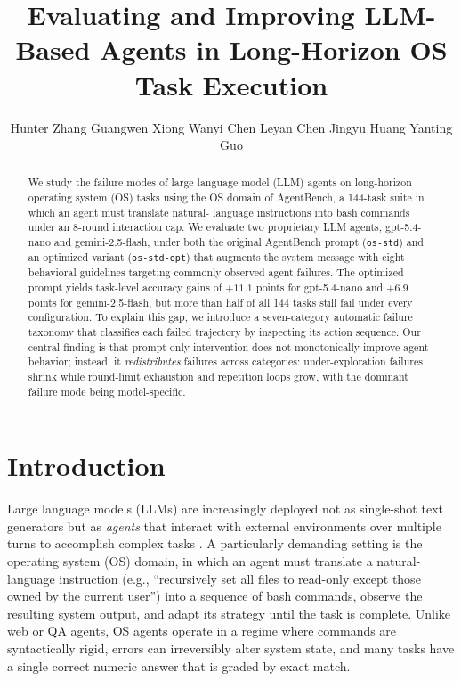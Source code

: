 \documentclass[11pt]{article}
\title{Evaluating and Improving LLM-Based Agents in Long-Horizon OS Task Execution}
\author{ Hunter Zhang \And Guangwen Xiong \And Wanyi Chen \And Leyan Chen \And Jingyu Huang \And Yanting Guo}
\begin{document}
\maketitle
\begin{abstract}
We study the failure modes of large language model (LLM) agents on
long-horizon operating system (OS) tasks using the OS domain of
AgentBench, a 144-task suite in which an agent must translate natural-
language instructions into bash commands under an 8-round interaction
cap. We evaluate two proprietary LLM agents, gpt-5.4-nano and
gemini-2.5-flash, under both the original AgentBench prompt
(\texttt{os-std}) and an optimized variant (\texttt{os-std-opt}) that
augments the system message with eight behavioral guidelines targeting
commonly observed agent failures. The optimized prompt yields task-level
accuracy gains of $+11.1$ points for gpt-5.4-nano and $+6.9$ points for
gemini-2.5-flash, but more than half of all 144 tasks still fail under
every configuration. To explain this gap, we introduce a seven-category
automatic failure taxonomy that classifies each failed trajectory by
inspecting its action sequence. Our central finding is that prompt-only
intervention does not monotonically improve agent behavior; instead, it
\emph{redistributes} failures across categories: under-exploration
failures shrink while round-limit exhaustion and repetition loops grow,
with the dominant failure mode being model-specific.
\end{abstract}

\section{Introduction}

Large language models (LLMs) are increasingly deployed not as single-shot
text generators but as \emph{agents} that interact with external
environments over multiple turns to accomplish complex tasks
\citep{yao2022react, liu2023agentbench, zhou2023webarena}. A particularly
demanding setting is the operating system (OS) domain, in which an agent
must translate a natural-language instruction (e.g., ``recursively set
all files to read-only except those owned by the current user'') into a
sequence of bash commands, observe the resulting system output, and
adapt its strategy until the task is complete. Unlike web or QA agents,
OS agents operate in a regime where commands are syntactically rigid,
errors can irreversibly alter system state, and many tasks have a single
correct numeric answer that is graded by exact match.
\end{document}
